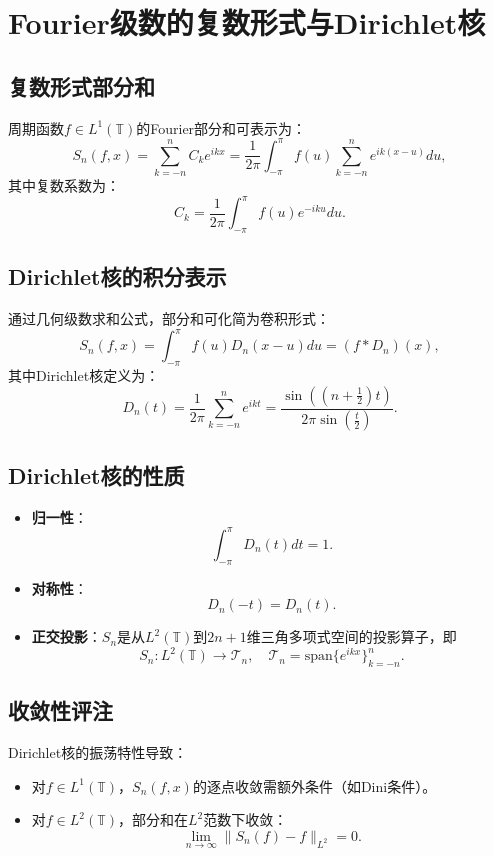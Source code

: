 \documentclass[12pt]{article}
\begin{document}
	\section{Fourier级数的复数形式与Dirichlet核}
	
	\subsection{复数形式部分和}
	周期函数$f \in L^1(\mathbb{T})$的Fourier部分和可表示为：
	\[
	S_n(f, x) = \sum_{k=-n}^n C_k e^{ikx} = \frac{1}{2\pi} \int_{-\pi}^{\pi} f(u) \sum_{k=-n}^n e^{ik(x-u)} du,
	\]
	其中复数系数为：
	\[
	C_k = \frac{1}{2\pi} \int_{-\pi}^{\pi} f(u) e^{-iku} du.
	\]
	
	\subsection{Dirichlet核的积分表示}
	通过几何级数求和公式，部分和可化简为卷积形式：
	\[
	S_n(f, x) = \int_{-\pi}^{\pi} f(u) D_n(x-u) du = (f * D_n)(x),
	\]
	其中Dirichlet核定义为：
	\[
	D_n(t) = \frac{1}{2\pi} \sum_{k=-n}^n e^{ikt} = \frac{\sin\left( (n+\frac{1}{2})t \right)}{2\pi \sin\left( \frac{t}{2} \right)}.
	\]
	
	\subsection{Dirichlet核的性质}
	\begin{itemize}
		\item \textbf{归一性}：
		\[
		\int_{-\pi}^{\pi} D_n(t) dt = 1.
		\]
		
		\item \textbf{对称性}：
		\[
		D_n(-t) = D_n(t).
		\]
		
		\item \textbf{正交投影}：$S_n$是从$L^2(\mathbb{T})$到$2n+1$维三角多项式空间的投影算子，即
		\[
		S_n: L^2(\mathbb{T}) \to \mathcal{T}_n, \quad \mathcal{T}_n = \mathrm{span}\{ e^{ikx} \}_{k=-n}^n.
		\]
	\end{itemize}
	
	\subsection{收敛性评注}
	Dirichlet核的振荡特性导致：
	\begin{itemize}
		\item 对$f \in L^1(\mathbb{T})$，$S_n(f,x)$的逐点收敛需额外条件（如Dini条件）。
		\item 对$f \in L^2(\mathbb{T})$，部分和在$L^2$范数下收敛：
		\[
		\lim_{n \to \infty} \| S_n(f) - f \|_{L^2} = 0.
		\]
	\end{itemize}
	
\end{document}
